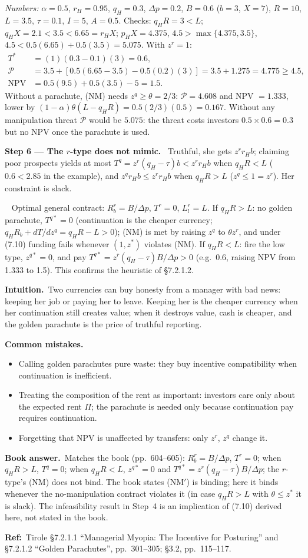 \documentclass[11pt,a4paper]{article}
\newcommand{\step}[2]{\par\medskip\noindent\textbf{Step #1 --- #2.}~}
\newcommand{\intuition}{\par\medskip\noindent\textbf{Intuition.}~}
\newcommand{\bookans}{\par\medskip\noindent\textbf{Book answer.}~}
\newcommand{\refbib}{\par\smallskip\noindent\textbf{Ref:}~}
\newcommand{\answer}[1]{\par\smallskip\noindent\fbox{\textbf{Answer #1.}}~}
\newcommand{\pitfalls}{\par\medskip\noindent\textbf{Common mistakes.}}
\newcommand{\dpp}{\Delta p}
\begin{document}
\emph{Numbers:} $\alpha=0.5$, $r_H=0.95$, $q_H=0.3$, $\dpp=0.2$, $B=0.6$ ($b=3$, $X=7$), $R=10$, $L=3.5$, $\tau=0.1$, $I=5$, $A=0.5$. Checks: $q_HR=3<L$; $q_HX=2.1<3.5<6.65=r_HX$; $p_HX=4.375$, $4.5>\max\{4.375,3.5\}$, $4.5<0.5(6.65)+0.5(3.5)=5.075$. With $z^r=1$:
\begin{align}
  T^* &= (1)(0.3-0.1)(3) = 0.6, \nonumber\\
  \mathcal P &= 3.5 + [0.5(6.65-3.5) - 0.5(0.2)(3)] = 3.5+1.275 = 4.775 \ge 4.5, \nonumber\\
  \mathrm{NPV} &= 0.5(9.5) + 0.5(3.5) - 5 = 1.5. \nonumber
\end{align}
Without a parachute, (NM) needs $z^q\ge\theta=2/3$: $\mathcal P=4.608$ and NPV $=1.333$, lower by $(1-\alpha)\theta(L-q_HR)=0.5(2/3)(0.5)=0.167$. Without any manipulation threat $\mathcal P$ would be $5.075$: the threat costs investors $0.5\times0.6=0.3$ but no NPV once the parachute is used.

\step{6}{The $r$-type does not mimic} Truthful, she gets $z^rr_Hb$; claiming poor prospects yields at most $T^q=z^r(q_H-\tau)b<z^rr_Hb$ when $q_HR<L$ ($0.6<2.85$ in the example), and $z^qr_Hb\le z^rr_Hb$ when $q_HR>L$ ($z^q\le1=z^r$). Her constraint is slack.

\answer{} Optimal general contract: $R_b^r=B/\dpp$, $T^r=0$, $L_l^r=L$. If $q_HR>L$: no golden parachute, $T^{q*}=0$ (continuation is the cheaper currency; $q_HR_b+dT/dz^q=q_HR-L>0$); (NM) is met by raising $z^q$ to $\theta z^r$, and under (7.10) funding fails whenever $(1,z^*)$ violates (NM). If $q_HR<L$: fire the low type, $z^{q*}=0$, and pay $T^{q*}=z^r(q_H-\tau)B/\dpp>0$ (e.g.\ 0.6, raising NPV from 1.333 to 1.5). This confirms the heuristic of \S7.2.1.2.

\intuition Two currencies can buy honesty from a manager with bad news: keeping her job or paying her to leave. Keeping her is the cheaper currency when her continuation still creates value; when it destroys value, cash is cheaper, and the golden parachute is the price of truthful reporting.

\pitfalls
\begin{itemize}
  \item Calling golden parachutes pure waste: they buy incentive compatibility when continuation is inefficient.
  \item Treating the composition of the rent as important: investors care only about the expected rent $\Pi$; the parachute is needed only because continuation pay requires continuation.
  \item Forgetting that NPV is unaffected by transfers: only $z^r$, $z^q$ change it.
\end{itemize}
\bookans Matches the book (pp.~604--605): $R_b^r=B/\dpp$, $T^r=0$; when $q_HR>L$, $T^q=0$; when $q_HR<L$, $z^{q*}=0$ and $T^{q*}=z^r(q_H-\tau)B/\dpp$; the $r$-type's (NM) does not bind. The book states (NM$'$) is binding; here it binds whenever the no-manipulation contract violates it (in case $q_HR>L$ with $\theta\le z^*$ it is slack). The infeasibility result in Step~4 is an implication of (7.10) derived here, not stated in the book.
\refbib{Tirole \S7.2.1.1 ``Managerial Myopia: The Incentive for Posturing'' and \S7.2.1.2 ``Golden Parachutes'', pp.~301--305; \S3.2, pp.~115--117.}
\end{document}
